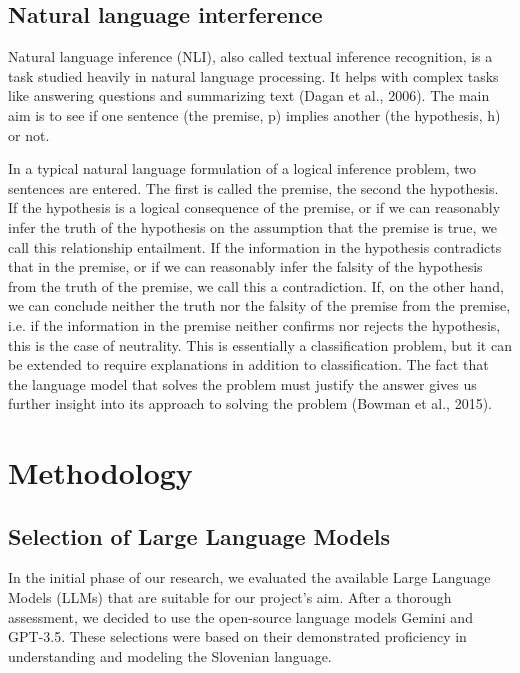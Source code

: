 \documentclass[fleqn,moreauthors,10pt]{ds_report}
\begin{document}
\subsection{Natural language interference}
Natural language inference (NLI), also called textual inference recognition, is a task studied heavily in natural language processing. It helps with complex tasks like answering questions and summarizing text (Dagan et al., 2006). The main aim is to see if one sentence (the premise, p) implies another (the hypothesis, h) or not.

In a typical natural language formulation of a logical inference problem, two sentences are entered. The first is called the premise, the second the hypothesis. If the hypothesis is a logical consequence of the premise, or if we can reasonably infer the truth of the hypothesis on the assumption that the premise is true, we call this relationship entailment. If the information in the hypothesis contradicts that in the premise, or if we can reasonably infer the falsity of the hypothesis from the truth of the premise, we call this a contradiction. If, on the other hand, we can conclude neither the truth nor the falsity of the premise from the premise, i.e. if the information in the premise neither confirms nor rejects the hypothesis, this is the case of neutrality. This is essentially a classification problem, but it can be extended to require explanations in addition to classification. The fact that the language model that solves the problem must justify the answer gives us further insight into its approach to solving the problem (Bowman et al., 2015).  



\section{Methodology}

\subsection{Selection of Large Language Models}

    In the initial phase of our research, we evaluated the available Large Language Models (LLMs) that are suitable for our project's aim. After a thorough assessment, we decided to use the open-source language models Gemini and GPT-3.5. These selections were based on their demonstrated proficiency in understanding and modeling the Slovenian language.
\end{document}
